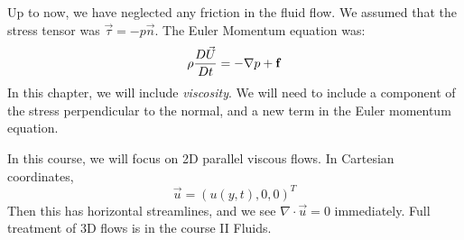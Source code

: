 \documentclass[../Main.tex]{subfiles}
\begin{document}
Up to now, we have neglected any friction in the fluid flow. We assumed that the stress tensor was $\vec{\tau} = -p\vec{n}$. The Euler Momentum equation was:
\begin{equation*}
    \rho \frac{D \vec{U}}{D t} = - \nabla p + \mathbf{f}
\end{equation*}
In this chapter, we will include \textit{viscosity}. We will need to include a component of the stress perpendicular to the normal, and a new term in the Euler momentum equation.

In this course, we will focus on 2D parallel viscous flows. In Cartesian coordinates,
\begin{equation*}
    \vec{u} = (u(y, t), 0, 0)^T
\end{equation*}
Then this has horizontal streamlines, and we see $\nabla \cdot \vec{u} = 0$ immediately. Full treatment of 3D flows is in the course II Fluids.
\end{document}

